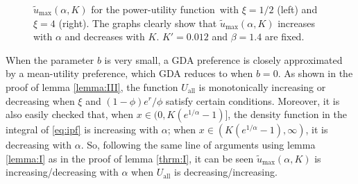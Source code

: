 \documentclass[11pt,a4]{amsart}
\newcommand{\fct}{function}
\newcommand{\1}{{\mathbf 1}}
\begin{document}
\begin{figure}[htb!]
\begin{minipage}{0.5\linewidth}
  \end{minipage}
  \caption{$\tilde u_{\text{max}}(\alpha, K)$ for the power-utility \fct\
    with $\xi=1/2$ (left) and $\xi=4$ (right). The graphs clearly show
    that  $\tilde u_{\text{max}}(\alpha, K)$ increases with $\alpha$
    and decreases with $K$. $K' = 0.012$ and $\beta = 1.4$ are fixed.
  }
  \label{fig:preference_pareto}
\end{figure}

When the parameter $b$ is very small, a GDA preference is closely
approximated by a mean-utility preference, which GDA reduces to when
$b = 0$. As shown in the proof of lemma \ref{lemma:III}, the function
$U_{\text{all}}$ is monotonically increasing or decreasing when $\xi$
and $(1 - \phi) e^r / \phi$ satisfy certain conditions. Moreover, it
is also easily checked that, when $x \in (0, K(e^{1/\alpha} - 1)]$,
the density function in the integral of \eqref{eq:ipf} is increasing
with $\alpha$; when $x \in (K(e^{1/\alpha} - 1), \infty)$, it is
decreasing with $\alpha$. So, following the same line of arguments
using lemma \ref{lemma:I} as in the proof of lemma \ref{thrm:I},
it can be seen $\tilde u_{\text{max}}(\alpha, K)$ is
increasing/decreasing with $\alpha$ when $U_{\text{all}}$ is
decreasing/increasing.
\end{document}
